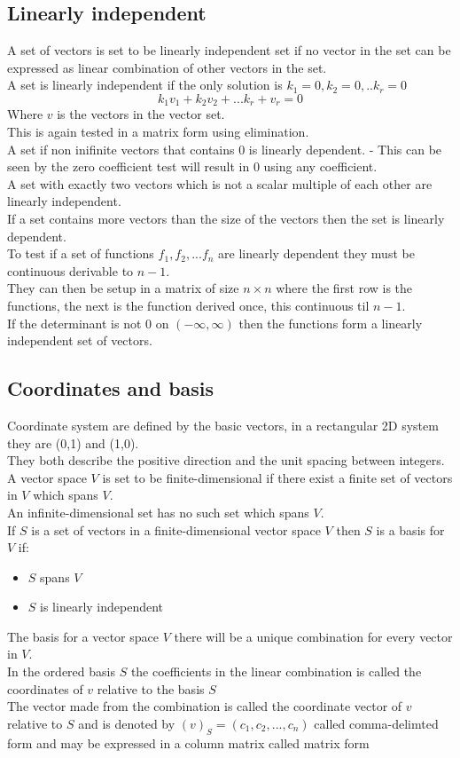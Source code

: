 \documentclass[12pt, a4paper]{article}
\begin{document}
		\subsection{Linearly independent}
			A set of vectors is set to be linearly independent set if no vector in the set can be expressed as linear combination of other vectors in the set.\\
			A set is linearly independent if the only solution is $k_1=0,k_2=0,..k_r=0$
			$$k_1v_1+k_2v_2+...k_r+v_r=0$$
			Where $v$ is the vectors in the vector set.\\
			This is again tested in a matrix form using elimination.\\
			A set if non inifinite vectors that contains 0 is linearly dependent. - This can be seen by the zero coefficient test will result in 0 using any coefficient.\\
			A set with exactly two vectors which is not a scalar multiple of each other are linearly independent.\\
			If a set contains more vectors than the size of the vectors then the set is linearly dependent.\\[4mm]
			To test if a set of functions $f_1,f_2,...f_n$ are linearly dependent they must be continuous derivable to $n-1$.\\
			They can then be setup in a matrix of size $n\times n$ where the first row is the functions, the next is the function derived once, this continuous til $n-1$.\\
			If the determinant is not 0 on $(-\infty,\infty)$ then the functions form a linearly independent set of vectors.
		\subsection{Coordinates and basis}
			Coordinate system are defined by the basic vectors, in a rectangular 2D system they are (0,1) and (1,0).\\
			They both describe the positive direction and the unit spacing between integers.\\
			A vector space $V$ is set to be finite-dimensional if there exist a finite set of vectors in $V$ which spans $V$.\\
			An infinite-dimensional set has no such set which spans $V$.\\
			If $S$ is a set of vectors in a finite-dimensional vector space $V$ then $S$ is a basis for $V$ if:
			\begin{itemize}
				\item $S$ spans $V$
				\item $S$ is linearly independent
			\end{itemize}
			The basis for a vector space $V$ there will be a unique combination for every vector in $V$.\\
			In the ordered basis $S$ the coefficients in the linear combination is called the coordinates of $v$ relative to the basis $S$\\
			The vector made from the combination is called the coordinate vector of $v$ relative to $S$ and is denoted by $(v)_S=(c_1,c_2,...,c_n)$ called comma-delimted form and may be expressed in a column matrix called matrix form\\
\end{document}
